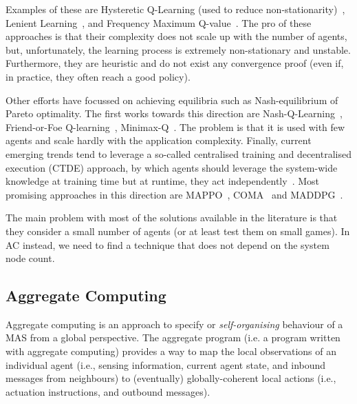 \documentclass[11pt]{article}
\begin{document}
Examples of these are Hysteretic Q-Learning (used to reduce non-stationarity)~\cite{hysteretic-q}, 
 Lenient Learning~\cite{DBLP:journals/jmlr/WeiL16}, and Frequency Maximum Q-value~\cite{DBLP:conf/atal/KaisersT10}.
%
The pro of these approaches is that their complexity does not scale up with the number of agents, 
 but, unfortunately, the learning process is extremely non-stationary and unstable.
% 
Furthermore, they are heuristic and do not exist any convergence proof (even if, in practice, they often reach a good policy).

Other efforts have focussed on achieving equilibria such as Nash-equilibrium of Pareto optimality.
 The first works towards this direction are Nash-Q-Learning~\cite{nash-q}, Friend-or-Foe Q-learning~\cite{DBLP:conf/icml/Littman01}, Minimax-Q~\cite{DBLP:conf/icml/Littman94}.
The problem is that it is used with few agents and scale hardly with the application complexity.
%
Finally, current emerging trends tend to leverage a so-called centralised training and decentralised execution (CTDE) approach, by which 
 agents should leverage the system-wide knowledge at training time but at runtime, they act independently~\cite{DBLP:journals/aamas/Hernandez-LealK19}.
 Most promising approaches in this direction are MAPPO~\cite{DBLP:journals/corr/abs-2103-01955}, COMA~\cite{DBLP:journals/corr/FoersterFANW17} and MADDPG~\cite{DBLP:conf/nips/LoweWTHAM17}.
 
The main problem with most of the solutions available in the literature is that they consider a small number of agents (or at least test them on small games).
 In AC instead, we need to find a technique that does not depend on the system node count.
\subsection{Aggregate Computing}

Aggregate computing is an approach to specify or \emph{self-organising} behaviour of a MAS from a global perspective.
%
The aggregate program (i.e. a program written with aggregate computing) provides a way to map the local observations of an individual agent (i.e., sensing information, current agent state, and inbound messages from neighbours) to (eventually) globally-coherent local actions
 (i.e., actuation instructions, and outbound messages).
%
\end{document}
